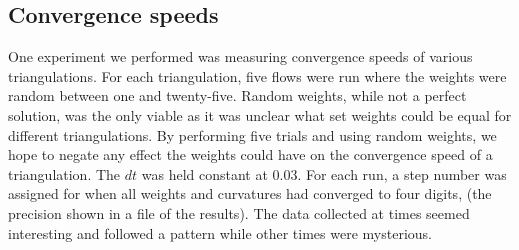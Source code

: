 \documentclass[12pt]{article}
\begin{document}
\subsection{Convergence speeds}

One experiment we performed was measuring convergence speeds of various triangulations. For each triangulation, five flows were run where the weights were random between one and twenty-five. Random weights, while not a perfect solution, was the only viable as it was unclear what set weights could be equal for different triangulations. By performing five trials and using random weights, we hope to negate any effect the weights could have on the convergence speed of a triangulation. The $dt$ was held constant at 0.03. For each run, a step number was assigned for when all weights and curvatures had converged to four digits, (the precision shown in a file of the results).  The data collected at times seemed interesting and followed a pattern while other times were mysterious.\newline
\end{document}
